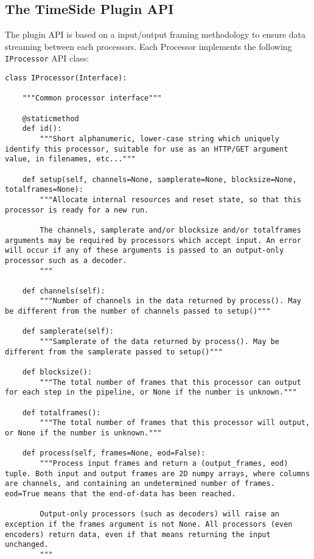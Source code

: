 \documentclass{article}
\begin{document}
\subsection{The TimeSide Plugin API}

The plugin API is based on a input/output framing methodology to ensure data streaming between each processors. Each Processor implements the following \verb|IProcessor| API class: 

\begin{lstlisting}
class IProcessor(Interface):

    """Common processor interface"""

    @staticmethod
    def id():
        """Short alphanumeric, lower-case string which uniquely identify this processor, suitable for use as an HTTP/GET argument value, in filenames, etc..."""

    def setup(self, channels=None, samplerate=None, blocksize=None, totalframes=None):
        """Allocate internal resources and reset state, so that this processor is ready for a new run.

        The channels, samplerate and/or blocksize and/or totalframes arguments may be required by processors which accept input. An error will occur if any of these arguments is passed to an output-only processor such as a decoder.
        """

    def channels(self):
        """Number of channels in the data returned by process(). May be different from the number of channels passed to setup()"""

    def samplerate(self):
        """Samplerate of the data returned by process(). May be different from the samplerate passed to setup()"""

    def blocksize():
        """The total number of frames that this processor can output for each step in the pipeline, or None if the number is unknown."""

    def totalframes():
        """The total number of frames that this processor will output, or None if the number is unknown."""

    def process(self, frames=None, eod=False):
        """Process input frames and return a (output_frames, eod) tuple. Both input and output frames are 2D numpy arrays, where columns are channels, and containing an undetermined number of frames. eod=True means that the end-of-data has been reached.

        Output-only processors (such as decoders) will raise an exception if the frames argument is not None. All processors (even encoders) return data, even if that means returning the input unchanged.
        """


\end{lstlisting}
\end{document}
